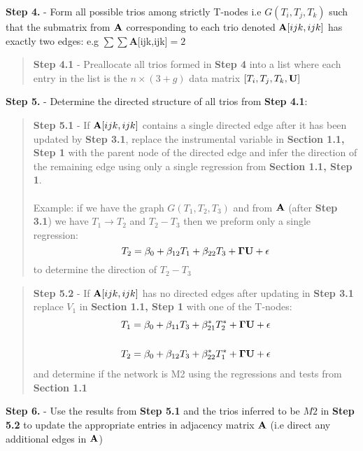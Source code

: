 \documentclass[12pt]{report}
\begin{document}
\noindent \textbf{Step 4.} - Form all possible trios among strictly T-nodes i.e $G(T_i, T_j, T_k)$ such that the submatrix from $\bf A$ corresponding to each trio denoted ${\bf A}[ijk,ijk]$ has exactly two edges: e.g $\sum \sum ${\bf A}[ijk,ijk]$ = 2$ 

\begin{quote}
\noindent \textbf{Step 4.1} -  Preallocate all trios formed in \textbf{Step 4} into a list where each entry in the list is the $n\times(3 +g)$ data matrix $[T_i,T_j,T_k, \bf{U}]$
\end{quote}

\noindent \textbf{Step 5.} - Determine the directed structure of all trios from \textbf{Step 4.1}:

\begin{quote}
\noindent \textbf{Step 5.1} - If ${\bf A}[ijk,ijk]$ contains a single directed edge after it has been updated by \textbf{Step 3.1}, replace the instrumental variable in \textbf{Section 1.1, Step 1} with the parent node of the directed edge and infer the direction of the remaining edge using only a single regression from \textbf{Section 1.1, Step 1}. \\
\\
Example: if we have the graph $G(T_1, T_2, T_3)$ and from $\bf A$ (after \textbf{Step 3.1}) we have $T_1 \rightarrow T_2$ and $T_2 - T_3$ then we preform only a single regression:
\[ T_2 = \beta_0 + \beta_{12}T_1 + \beta_{22} T_3 + {\bf \Gamma U} + \epsilon \] 
to determine the direction of $T_2 - T_3$
\end{quote}

\begin{quote}
\noindent\textbf{Step 5.2} - If ${\bf A}[ijk,ijk]$ has no directed edges after updating in \textbf{Step 3.1} replace $V_1$ in \textbf{Section 1.1, Step 1} with one of the T-nodes:
\begin{eqnarray}
T_1 = \beta_0 +\beta_{11}T_3+\beta_{21}^{\ast}T_2^{\ast}+{\bf \Gamma U}+ \epsilon \\
\nonumber\\
T_2 = \beta_0 +\beta_{12}T_3+\beta_{22}^{\ast}T_1^{\ast}+{\bf \Gamma U}+ \epsilon 
\end{eqnarray}
and determine if the network is M2 using the regressions and tests from \textbf{Section 1.1}\\
\end{quote} 

\noindent \textbf{Step 6.} - Use the results from \textbf{Step 5.1} and the trios inferred to be $M2$ in \textbf{Step 5.2} to update the appropriate entries in adjacency matrix $\bf{A}$ (i.e direct any additional edges in $\bf A$)\\
\end{document}
